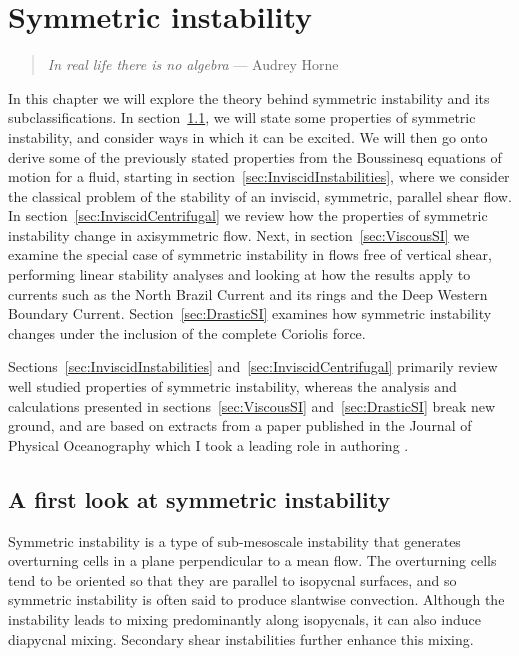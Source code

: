 \chapter{Symmetric instability}
\label{chap:2}
\begin{quote}
    \textit{In real life there is no algebra} --- Audrey Horne
\end{quote}

In this chapter we will explore the theory behind symmetric instability and its subclassifications. In section~\ref{sec:FirstLook}, we will state some properties of symmetric instability, and consider ways in which it can be excited. We will then go onto derive some of the previously stated properties from the Boussinesq equations of motion for a fluid, starting in section~\ref{sec:InviscidInstabilities}, where we consider the classical problem of the stability of an inviscid, symmetric, parallel shear flow. In section~\ref{sec:InviscidCentrifugal} we review how the properties of symmetric instability change in axisymmetric flow. Next, in section~\ref{sec:ViscousSI} we examine the special case of symmetric instability in flows free of vertical shear, performing linear stability analyses and looking at how the results apply to currents such as the North Brazil Current and its rings and the Deep Western Boundary Current. Section~\ref{sec:DrasticSI} examines how symmetric instability changes under the inclusion of the complete Coriolis force.

Sections~\ref{sec:InviscidInstabilities} and~\ref{sec:InviscidCentrifugal} primarily review well studied properties of symmetric instability, whereas the analysis and calculations presented in sections~\ref{sec:ViscousSI} and~\ref{sec:DrasticSI} break new ground, and are based on extracts from a paper published in the Journal of Physical Oceanography which I took a leading role in authoring \citep{Goldsworth2021a}.

\section{A first look at symmetric instability}
\label{sec:FirstLook}
Symmetric instability is a type of sub-mesoscale instability that generates overturning cells in a plane perpendicular to a mean flow. The overturning cells tend to be oriented so that they are parallel to isopycnal surfaces, and so symmetric instability is often said to produce slantwise convection. Although the instability leads to mixing predominantly along isopycnals, it can also induce diapycnal mixing. Secondary shear instabilities further enhance this mixing.

